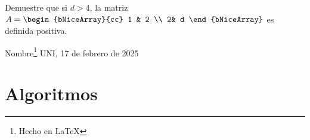 \begin{questions}
\begin{multicols}{3}
    \end{multicols}

    \question

    Demuestre que si $d>4$, la matriz
    $A=\begin{bNiceArray}{cc}
            1 & 2 \\
            2& d
        \end{bNiceArray}$
    es definida positiva.
\end{questions}

\providecommand{\name}{Nombre}
\vfill{Nombre}\footnote{Hecho en \LaTeX}
\hfill{UNI, 17 de febrero de 2025}

\clearpage

\appendix

\section{Algoritmos}

